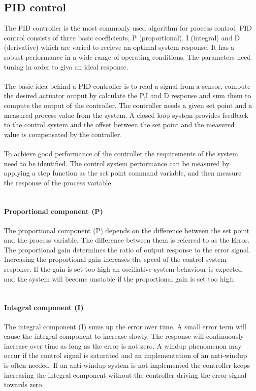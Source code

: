 \subsection{PID control}
The PID controller is the most commonly used algorithm for process control. 
PID control consists of three basic coefficients, P (proportional), I (integral) and D (derivative) which are varied to recieve an optimal system response. It has a robust performance in a wide range of operating conditions. The parameters need tuning in order to giva an ideal response.\\
\\
The basic idea behind a PID controller is to read a signal from a sensor, compute the desired actuator output by calculate the P,I and D response and sum them to compute the output of the controller. The controller needs a given set point and a measured process value from the system. A closed loop system provides feedback to the control system and the offset between the set point and the measured value is compensated by the controller.
\\
\\
To achieve good performance of the controller the requirements of the system need to be identified. The control system performance can be measured by applying a step function as the set point command variable, and then measure the response of the process variable.
\\
\\
\paragraph{Proportional component (P)} 
The proportional component (P) depends on the difference between the set point and the process variable. The difference between them is referred to as the Error. The proportional gain determines the ratio of output response to the error signal. Increasing the proportional gain increases the speed of the control system response. If the gain is set too high an oscillative system behaviour is expected and the system will become unstable if the proportional gain is set too high. 
\\
\\
\paragraph{Integral component (I)}
The integral component (I) sums up the error over time. A small error term will cause the integral component to increase slowly. The response will continuously increase over time as long as the error is not zero. A windup phenomenon may occur if the control signal is saturated and an implementation of an anti-windup is often needed. If an anti-windup system is not implemented the controller keeps increasing the integral component without the controller driving the error signal towards zero. 
\\
\\
